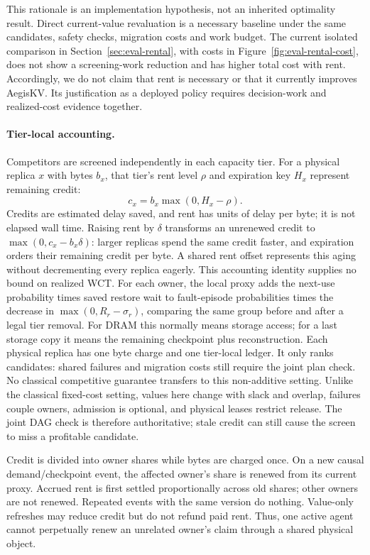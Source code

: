 This rationale is an implementation hypothesis, not an inherited
optimality result. Direct current-value revaluation is a necessary
baseline under the same candidates, safety checks, migration costs and
work budget. The current isolated comparison in
Section~\ref{sec:eval-rental}, with costs in Figure~\ref{fig:eval-rental-cost},
does not show a screening-work reduction and has higher total cost with
rent. Accordingly, we do not claim that rent is necessary or that it
currently improves AegisKV. Its justification as a deployed policy
requires decision-work and realized-cost evidence together.

\paragraph{Tier-local accounting.}
Competitors are screened independently in each capacity tier. For a physical replica
$x$ with bytes $b_x$, that tier's rent level $\rho$ and expiration key
$H_x$ represent remaining credit:
\begin{equation}
 c_x=b_x\max(0,H_x-\rho).
 \label{eq:rent}
\end{equation}
Credits are estimated delay saved, and rent has units of delay per byte;
it is not elapsed wall time. Raising rent by $\delta$ transforms an
unrenewed credit to $\max(0,c_x-b_x\delta)$: larger replicas spend the
same credit faster, and expiration orders their remaining credit per
byte. A shared rent offset represents this aging without decrementing
every replica eagerly. This accounting identity supplies no bound on
realized WCT. For each owner, the local proxy adds the next-use probability times
saved restore wait to fault-episode probabilities times the decrease in
$\max(0,R_r-\sigma_r)$, comparing the same group before and after a legal tier removal.
For DRAM this normally means storage access; for a last storage copy it
means the remaining checkpoint plus reconstruction. Each physical replica
has one byte charge and one tier-local ledger.
It only ranks candidates:
shared failures and migration costs still require the joint plan check.
No classical competitive guarantee transfers to this non-additive setting.
Unlike the classical fixed-cost setting, values here change with slack
and overlap, failures couple owners, admission is optional, and physical
leases restrict release. The joint DAG check is therefore authoritative;
stale credit can still cause the screen to miss a profitable candidate.

Credit is divided into owner shares while bytes are charged once. On a
new causal demand/checkpoint event, the affected owner's share is renewed
from its current proxy. Accrued rent is first settled proportionally across
old shares; other owners are not renewed. Repeated events with the same
version do nothing. Value-only refreshes may reduce credit but do not
refund paid rent. Thus, one active agent cannot perpetually renew an
unrelated owner's claim through a shared physical object.

